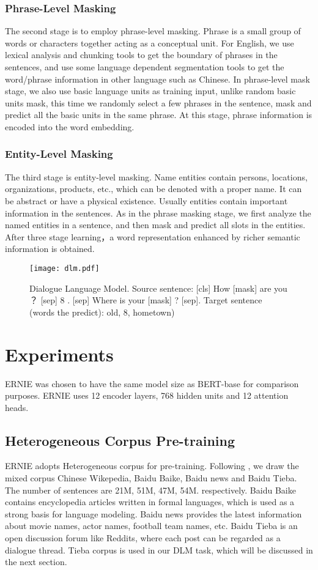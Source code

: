 \documentclass[11pt,a4paper]{article}
\begin{document}
\subsubsection{Phrase-Level Masking}
The second stage is to employ phrase-level masking. Phrase is a small group of words or characters together acting as a conceptual unit. For English, we use lexical analysis and chunking tools to get the boundary of phrases in the sentences, and use some language dependent segmentation tools to get the word/phrase information in other language such as Chinese. In phrase-level mask stage, we also use basic language units as training input, unlike random basic units mask, this time we randomly select a few phrases in the sentence, mask and predict all the basic units in the same phrase. At this stage, phrase information is encoded into the word embedding. 

\subsubsection{Entity-Level Masking}
The third stage is entity-level masking. Name entities contain persons, locations, organizations, products, etc., which can be denoted with a proper name. It can be abstract or have a physical existence. Usually entities contain important information in the sentences. As in the phrase masking stage, we first analyze the named entities in a sentence, and then mask and predict all slots in the entities. After three stage learning，a word representation enhanced by richer semantic information is obtained.


\begin{figure*} 
\centerline{\texttt{[image: dlm.pdf]}}
\caption{Dialogue Language Model. Source sentence: [cls] How [mask] are you ？ [sep] 8 . [sep] Where is your [mask] ? [sep]. Target sentence (words the predict): old, 8, hometown)
}
\label{DLM_fig}
\end{figure*}


\section{Experiments}
ERNIE was chosen to have the same model size as BERT-base for comparison purposes. ERNIE uses 12 encoder layers, 768 hidden units and 12 attention heads.
\subsection{Heterogeneous Corpus Pre-training}
ERNIE adopts Heterogeneous corpus for pre-training. Following \cite{google_use}, we draw the mixed corpus Chinese Wikepedia, Baidu Baike, Baidu news and Baidu Tieba. The number of sentences are 21M, 51M, 47M, 54M. respectively. Baidu Baike contains encyclopedia articles written in formal languages, which is used as a strong basis for language modeling. Baidu news provides the latest information about movie names, actor names, football team names, etc. Baidu Tieba is an open discussion forum like Reddits, where each post can be regarded as a dialogue thread. Tieba corpus is used in our DLM task, which will be discussed in the next section. 
\end{document}
